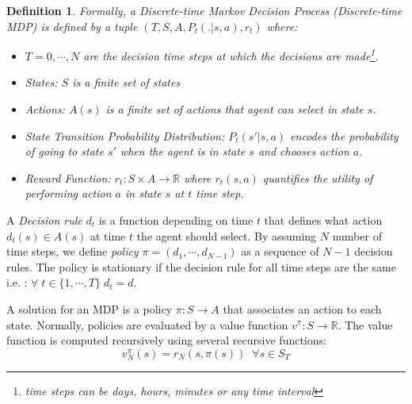 \documentclass[10pt,journal,compsoc]{IEEEtran}
\newtheorem{definition}{Definition}
\begin{document}
\begin{definition}
Formally, a \emph{Discrete-time Markov Decision Process (Discrete-time MDP)} \cite{timeMDP} is defined by a tuple $(T, S, A, P_t(.|s,a), r_t)$ where:

\begin{itemize}
\item[-] $T=0,\cdots, N$ are the decision time steps at which the decisions are made\footnote{time steps can be days, hours, minutes or any time interval}. 
\item[-]States: $S$ is a finite set of states
\item[-] Actions: $A(s)$ is a finite set of actions that agent can select in state $s$.
\item[-] State Transition Probability Distribution: $P_t(s'| s,a)$ encodes the probability of going to state $s'$ when the agent is in state $s$ and chooses action $a$.
\item[-] Reward Function: $r_t : S \times A \longrightarrow \mathbb{R}$ where $r_t(s,a)$ quantifies the utility of performing action $a$ in state $s$ at $t$ time step.
\end{itemize}

\end{definition}

A \emph{Decision rule} $d_t$ is a function depending on time $t$ that defines what action $d_t(s) \in A(s)$ at time $t$ the agent should select. By assuming $N$ number of time steps, we define \emph{policy} $\pi = (d_1, \cdots, d_{N-1})$ as a sequence of $N-1$  decision rules. The policy is stationary if the decision rule for all time steps are the same i.e. : $\forall \; t \in \{1, \cdots, T \} \; d_t = d$. 

A solution for an MDP is a policy $\pi: S \longrightarrow A$ that associates an action to each state. Normally, policies are evaluated by a value function $v^{\pi} : S \longrightarrow \mathbb{R}$. The value function is computed recursively using several recursive functions: %
\begin{equation}
v^{\pi}_N(s) = r_N(s, \pi(s)) \;\; \forall s\in S_T
\end{equation}
\end{document}
